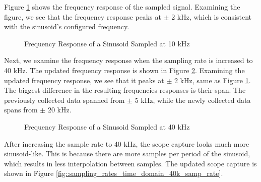 \documentclass{article}
\begin{document}
Figure \ref{fig::sampling_rates_freq_domain_10k_samp_rate} shows the frequency response of the sampled signal. Examining the figure, we see that the frequency response peaks at $\pm$ 2 kHz, which is consistent with the sinusoid's configured frequency.

\begin{figure}[H]
	\centerline{}
	\caption{Frequency Response of a Sinusoid Sampled at 10 kHz}
	\label{fig::sampling_rates_freq_domain_10k_samp_rate}
\end{figure}

Next, we examine the frequency response when the sampling rate is increased to 40 kHz. The updated frequency response is shown in Figure \ref{fig::sampling_rates_freq_domain_40k_samp_rate}. Examining the updated frequency response, we see that it peaks at $\pm$ 2 kHz, same as Figure \ref{fig::sampling_rates_freq_domain_10k_samp_rate}. The biggest difference in the resulting frequencies responses is their span. The previously collected data spanned from $\pm$ 5 kHz, while the newly collected data spans from $\pm$ 20 kHz.

\begin{figure}[H]
	\centerline{}
	\caption{Frequency Response of a Sinusoid Sampled at 40 kHz}
	\label{fig::sampling_rates_freq_domain_40k_samp_rate}
\end{figure}

After increasing the sample rate to 40 kHz, the scope capture looks much more sinusoid-like. This is because there are more samples per period of the sinusoid, which results in less interpolation between samples. The updated scope capture is shown in Figure \ref{fig::sampling_rates_time_domain_40k_samp_rate}.
\end{document}
